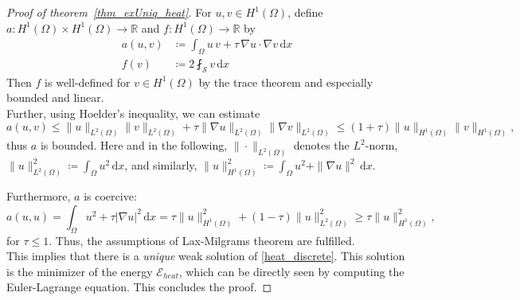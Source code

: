 \documentclass[12pt,openany]{book}
\newcommand{\R}{\mathbb{R}}
\def\S{\mathcal{S}}
\theoremstyle{plainnormal}
\theoremstyle{remark}
\begin{document}
\begin{proof}[Proof of theorem~\ref{thm_exUniq_heat}]
    For $u,v \in H^1(\Omega)$, define $a: H^1(\Omega)\times H^1(\Omega) \rightarrow \R$ and $f: H^1(\Omega) \rightarrow\R$ by 
    \begin{align*}
        a(u,v) &\coloneqq \int_\Omega u\,v + \tau \,\nabla u\cdot\nabla v \,\mathrm{d}x\\
        f(v) & \coloneqq 2\fint_\S v \,\mathrm{d}x 
    \end{align*}
    Then $f$ is well-defined for $v \in H^1(\Omega)$ by the trace theorem and especially bounded and linear.\\
    Further, using Hoelder's inequality, we can estimate  $$a(u,v) \leq \|u\|_{L^2(\Omega)}\|v\|_{L^2(\Omega)} + \tau \|\nabla u\|_{L^2(\Omega)}\|\nabla v\|_{L^2(\Omega)} \leq (1 + \tau) \|u\|_{H^1(\Omega)}\|v\|_{H^1(\Omega)},$$ thus $a$ is bounded. Here and in the following, $\|\cdot\|_{L^2(\Omega)}$ denotes the $L^2$-norm, $\|u\|^2_{L^2(\Omega)} \coloneqq \int_\Omega u^2\, \mathrm{d}x$, and similarly, $\|u\|^2_{H^1(\Omega)} \coloneqq \int_\Omega u^2 + \|\nabla u\|^2\, \mathrm{d}x$. \par
    Furthermore, $a$ is coercive:  $$a(u,u) = \int_\Omega u^2 + \tau |\nabla u|^2 \,\mathrm{d}x = \tau \|u\|^2_{H^1(\Omega)} + (1-\tau) \|u\|^2_{L^2(\Omega)} \geq \tau \|u\|^2_{H^1(\Omega)},$$ for $\tau \leq 1$. Thus, the assumptions of Lax-Milgrams theorem are fulfilled. \\
    This implies that there is a \emph{unique} weak solution of \cref{heat_discrete}. This solution is the minimizer of the energy $\mathcal{E}_{heat}$, which can be directly seen by computing the Euler-Lagrange equation. This concludes the proof.
\end{proof}
\end{document}
